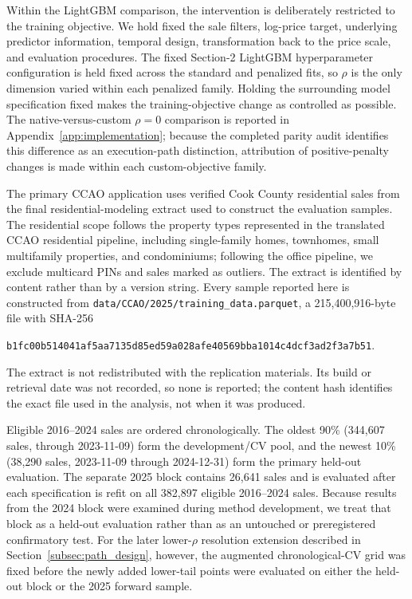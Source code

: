 \documentclass[10pt]{article}
\theoremstyle{definition}
\newcommand{\1}{\mathbf{1}}
\begin{document}
{Within the LightGBM comparison, the intervention is deliberately restricted to the training objective. We hold fixed the sale filters, log-price target, underlying predictor information, temporal design, transformation back to the price scale, and evaluation procedures. The
fixed Section-2 LightGBM hyperparameter configuration is held fixed across the standard and penalized fits, so $\rho$ is the only dimension varied within each penalized family.
Holding the surrounding model specification fixed makes the training-objective change as controlled as possible. The native-versus-custom $\rho=0$ comparison is reported in Appendix~\ref{app:implementation}; because the completed parity audit identifies this difference as an execution-path distinction, attribution of positive-penalty changes is made within each custom-objective family.}


The primary CCAO application uses verified Cook County residential sales from the final residential-modeling extract used to construct the evaluation samples. The residential scope follows the property types represented in the translated CCAO residential pipeline, including single-family homes, townhomes, small multifamily properties, and condominiums; following the office pipeline, we exclude multicard PINs and sales marked as outliers.
The extract is identified by content rather than by a version string. Every
sample reported here is constructed from
\texttt{data/CCAO/2025/training\_data.parquet}, a 215,400,916-byte file with SHA-256
\begin{center}
\texttt{\small b1fc00b514041af5aa7135d85ed59a028afe40569bba1014c4dcf3ad2f3a7b51}.
\end{center}
The extract is not redistributed with the replication materials. Its build or retrieval
date was not recorded, so none is reported; the content hash identifies the exact file
used in the analysis, not when it was produced.


Eligible 2016--2024 sales are ordered chronologically. The oldest 90\% (344,607 sales, through 2023-11-09) form the development/CV pool, and the newest 10\% (38,290 sales, 2023-11-09 through 2024-12-31) form the primary held-out evaluation. The separate 2025 block contains 26,641 sales and is evaluated after each specification is refit on all 382,897 eligible 2016--2024 sales.
Because results from the 2024 block were examined during method development, we treat that block as a held-out evaluation rather than as an untouched or preregistered confirmatory test. For the later lower-$\rho$ resolution extension described in Section~\ref{subsec:path_design}, however, the augmented chronological-CV grid was fixed before the newly added lower-tail points were evaluated on either the held-out block or the 2025 forward sample.
\end{document}
